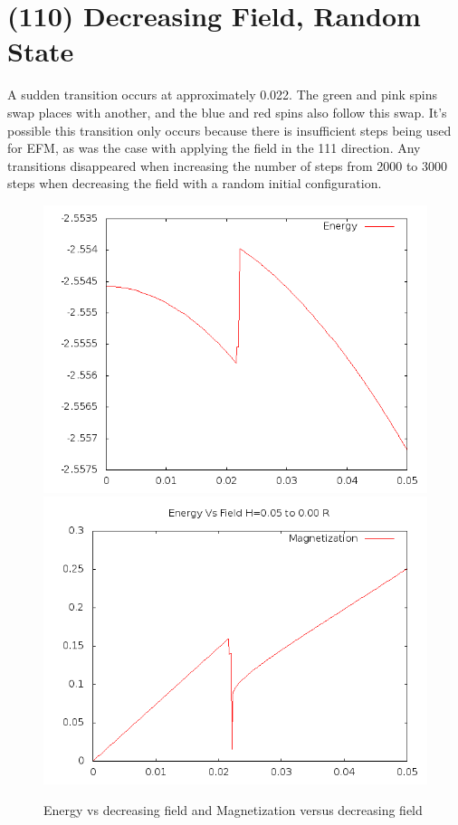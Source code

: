 \documentclass{article}
\begin{document}
\section{(110) Decreasing Field, Random State}
A sudden transition occurs at approximately 0.022. The green and pink spins swap places with another, and the blue
and red spins also follow this swap. It's possible this transition only occurs because there is insufficient
steps being used for EFM, as was the case with applying the field in the 111 direction. Any transitions disappeared
when increasing the number of steps from 2000 to 3000 steps when decreasing the field with a random initial 
configuration. 
\begin{figure}[ht]
 \centering 
\includegraphics[scale=0.3]{110/E005to000R.png}
\includegraphics[scale=0.3]{110/M005to000R.png}
\caption{Energy vs decreasing field and Magnetization versus decreasing field}
\end{figure}
\end{document}
